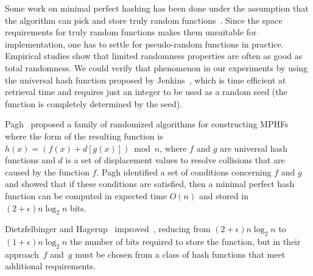 Some work on minimal perfect hashing has been done under the assumption that
the algorithm can pick and store truly random functions~\cite{bkz05,chm92,p99}.
Since the space requirements for truly random functions makes them unsuitable for
implementation, one has to settle for pseudo-random functions in practice. 
Empirical studies show that limited randomness properties are often as good as
total randomness.
We could verify that phenomenon in our experiments by using the universal hash
function proposed by Jenkins~\cite{j97}, which is
time efficient at retrieval time and requires just an integer to be used as a
random seed (the function is completely determined by the seed). 

Pagh~\cite{p99} proposed a family of randomized algorithms for
constructing MPHFs
where the form of the resulting function is $h(x) = (f(x) + d[g(x)]) \bmod n$,
where $f$ and $g$ are universal hash functions and $d$ is a set of
displacement values to resolve collisions that are caused by the function $f$.
Pagh identified a set of conditions concerning $f$ and $g$ and showed
that if these conditions are satisfied, then a minimal perfect hash
function can be computed in expected time $O(n)$ and stored in
$(2+\epsilon)n\log_2n$ bits.

Dietzfelbinger and Hagerup~\cite{dh01} improved~\cite{p99},
reducing from $(2+\epsilon)n\log_2n$ to $(1+\epsilon)n\log_2n$ the number of bits
required to store the function, but in their approach~$f$ and~$g$ must
be chosen from a class
of hash functions that meet additional requirements.
  
